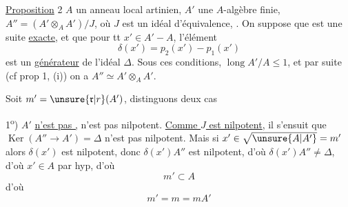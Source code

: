 \uline{Proposition} 2 \quad {} $A$ un anneau local artinien, $A'$ une $A$-algèbre finie, $A''=(A'\otimes_A A')/J$, où $J$ est un idéal d'équivalence,  . On suppose que 
est une suite \uline{exacte}, et que pour tt $x'\in A'\mathbin{-}A$, l'élément
\[
\delta(x')=p_2(x')-p_1(x')
\]
est un \uline{générateur} de l'idéal $\Delta$.
Sous ces conditions, $\operatorname{long} A'/A\leq1$, et par suite (cf prop 1, (i)) on a $A''\simeq A'\otimes_A A'$.

Soit $m'=\unsure{\mathfrak r|r}(A')$, distinguons deux cas

1\textsuperscript{o}) $A'$ \uline{n'est pas ,}    n'est pas nilpotent. \uline{Comme $J$ est nilpotent}, il s'ensuit que $\operatorname{Ker}(A''\longrightarrow A')=\Delta$ n'est pas nilpotent. Mais si $x'\in\sqrt{\unsure{A|A'}}=m'$  alors $\delta(x')$ est nilpotent, donc $\delta(x')A''$ est nilpotent, d'où $\delta(x')A''\ne\Delta$, d'où $x'\in A$ par hyp, d'où
\[
m'\subset A
\]
 d'où
\[
m'=m=mA'
\]
